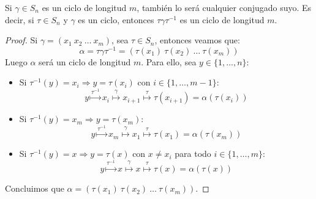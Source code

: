 \begin{prop}
    Si $\gamma\in S_n$ es un ciclo de longitud $m$, también lo será cualquier conjugado suyo. Es decir, si $\tau\in S_n$ y $\gamma$ es un ciclo, entonces $\tau\gamma\tau^{-1}$ es un ciclo de longitud $m$.
    \begin{proof}
        Si $\gamma=(x_1\ x_2\ \ldots\ x_m)$, sea $\tau \in S_n$, entonces veamos que:
        \begin{equation*}
            \alpha = \tau \gamma\tau^{-1} = (\tau(x_1)\ \tau(x_2)\ \ldots\ \tau(x_m))
        \end{equation*}
        Luego $\alpha$ será un ciclo de longitud $m$. Para ello, sea $y\in \{1,\ldots,n\}$:
        \begin{itemize}
            \item Si $\tau^{-1}(y) = x_i\Longrightarrow y=\tau(x_i)$ con $i \in \{1,\ldots,m-1\}$:
                \begin{equation*}
                    y \stackrel{\tau^{-1}}{\longmapsto} x_i \stackrel{\gamma}{\longmapsto} x_{i+1} \stackrel{\tau}{\longmapsto} \tau(x_{i+1}) = \alpha(\tau(x_i))
                \end{equation*}
            \item Si $\tau^{-1}(y) = x_{m}\Longrightarrow y=\tau(x_m)$:
                \begin{equation*}
                    y \stackrel{\tau^{-1}}{\longmapsto} x_m \stackrel{\gamma}{\longmapsto} x_1 \stackrel{\tau}{\longmapsto} \tau(x_1) = \alpha(\tau(x_m))
                \end{equation*}
            \item Si $\tau^{-1}(y) = x\Longrightarrow y=\tau(x)$ con $x\neq x_i$ para todo $i \in \{1,\ldots,m\}$:
                \begin{equation*}
                    y \stackrel{\tau^{-1}}{\longmapsto} x \stackrel{\gamma}{\longmapsto} x \stackrel{\tau}{\longmapsto} \tau(x) = \alpha(\tau(x))
                \end{equation*}
        \end{itemize}
        Concluimos que $\alpha = (\tau(x_1)\ \tau(x_2)\ \ldots\ \tau(x_m))$.
    \end{proof}
\end{prop}

